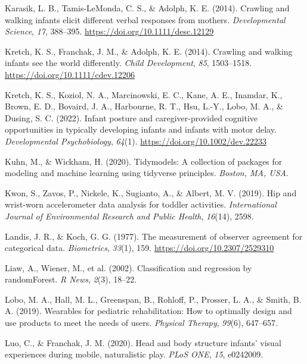 \documentclass[
  man]{apa6}
\newlength{\cslhangindent}
\newlength{\cslentryspacingunit} %
\newenvironment{CSLReferences}[2] %
 {%
  \setlength{\parindent}{0pt}
  \ifodd #1
  \let\oldpar\par
  \def\par{\hangindent=\cslhangindent\oldpar}
  \fi
  \setlength{\parskip}{#2\cslentryspacingunit}
 }%
 {}
\begin{document}
\begin{CSLReferences}{1}{0}
\leavevmode{}%
Karasik, L. B., Tamis-LeMonda, C. S., \& Adolph, K. E. (2014). Crawling and walking infants elicit different verbal responses from mothers. \emph{Developmental Science}, \emph{17}, 388--395. \url{https://doi.org/10.1111/desc.12129}

\leavevmode{}%
Kretch, K. S., Franchak, J. M., \& Adolph, K. E. (2014). Crawling and walking infants see the world differently. \emph{Child Development}, \emph{85}, 1503--1518. \url{https://doi.org/10.1111/cdev.12206}

\leavevmode{}%
Kretch, K. S., Koziol, N. A., Marcinowski, E. C., Kane, A. E., Inamdar, K., Brown, E. D., Bovaird, J. A., Harbourne, R. T., Hsu, L.-Y., Lobo, M. A., \& Dusing, S. C. (2022). Infant posture and caregiver-provided cognitive opportunities in typically developing infants and infants with motor delay. \emph{Developmental Psychobiology}, \emph{64}(1). \url{https://doi.org/10.1002/dev.22233}

\leavevmode{}%
Kuhn, M., \& Wickham, H. (2020). Tidymodels: A collection of packages for modeling and machine learning using tidyverse principles. \emph{Boston, MA, USA}.

\leavevmode{}%
Kwon, S., Zavos, P., Nickele, K., Sugianto, A., \& Albert, M. V. (2019). Hip and wrist-worn accelerometer data analysis for toddler activities. \emph{International Journal of Environmental Research and Public Health}, \emph{16}(14), 2598.

\leavevmode{}%
Landis, J. R., \& Koch, G. G. (1977). The measurement of observer agreement for categorical data. \emph{Biometrics}, \emph{33}(1), 159. \url{https://doi.org/10.2307/2529310}

\leavevmode{}%
Liaw, A., Wiener, M., et al. (2002). Classification and regression by randomForest. \emph{R News}, \emph{2}(3), 18--22.

\leavevmode{}%
Lobo, M. A., Hall, M. L., Greenspan, B., Rohloff, P., Prosser, L. A., \& Smith, B. A. (2019). Wearables for pediatric rehabilitation: How to optimally design and use products to meet the needs of users. \emph{Physical Therapy}, \emph{99}(6), 647--657.

\leavevmode{}%
Luo, C., \& Franchak, J. M. (2020). Head and body structure infants' visual experiences during mobile, naturalistic play. \emph{{PLoS ONE}}, \emph{15}, e0242009.


\end{CSLReferences}
\end{document}
